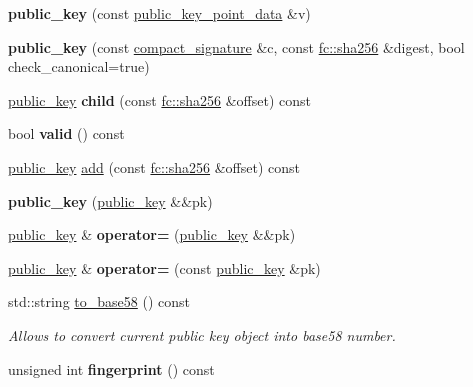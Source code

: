 \begin{DoxyCompactItemize}
{\bfseries public\+\_\+key} (const \mbox{\hyperlink{classfc_1_1array}{public\+\_\+key\+\_\+point\+\_\+data}} \&v)
\item 
\mbox{\label{classfc_1_1ecc_1_1public__key_ae2649fc2d1cf143a4519f33772e4525d}} 
{\bfseries public\+\_\+key} (const \mbox{\hyperlink{classfc_1_1array}{compact\+\_\+signature}} \&c, const \mbox{\hyperlink{classfc_1_1sha256}{fc\+::sha256}} \&digest, bool check\+\_\+canonical=true)
\item 
\mbox{\label{classfc_1_1ecc_1_1public__key_a40395b76b59e9ab3eb6b59925a62b093}} 
\mbox{\hyperlink{classfc_1_1ecc_1_1public__key}{public\+\_\+key}} {\bfseries child} (const \mbox{\hyperlink{classfc_1_1sha256}{fc\+::sha256}} \&offset) const
\item 
\mbox{\label{classfc_1_1ecc_1_1public__key_aab8d388b3e23e80a05cd62e2f3d94da2}} 
bool {\bfseries valid} () const
\item 
\mbox{\hyperlink{classfc_1_1ecc_1_1public__key}{public\+\_\+key}} \mbox{\hyperlink{classfc_1_1ecc_1_1public__key_a854601b24237d2723ff9672c1f6f17a7}{add}} (const \mbox{\hyperlink{classfc_1_1sha256}{fc\+::sha256}} \&offset) const
\item 
\mbox{\label{classfc_1_1ecc_1_1public__key_a400ebfdeea2d9d6bae80c0491a041afb}} 
{\bfseries public\+\_\+key} (\mbox{\hyperlink{classfc_1_1ecc_1_1public__key}{public\+\_\+key}} \&\&pk)
\item 
\mbox{\label{classfc_1_1ecc_1_1public__key_a0f44e10a2b5bc0cea474f11c88fcab45}} 
\mbox{\hyperlink{classfc_1_1ecc_1_1public__key}{public\+\_\+key}} \& {\bfseries operator=} (\mbox{\hyperlink{classfc_1_1ecc_1_1public__key}{public\+\_\+key}} \&\&pk)
\item 
\mbox{\label{classfc_1_1ecc_1_1public__key_a294d4a1e83961eb63dfe80064933b553}} 
\mbox{\hyperlink{classfc_1_1ecc_1_1public__key}{public\+\_\+key}} \& {\bfseries operator=} (const \mbox{\hyperlink{classfc_1_1ecc_1_1public__key}{public\+\_\+key}} \&pk)
\item 
\mbox{\label{classfc_1_1ecc_1_1public__key_a731da405da9f3482b49c72db07abdbae}} 
std\+::string \mbox{\hyperlink{classfc_1_1ecc_1_1public__key_a731da405da9f3482b49c72db07abdbae}{to\+\_\+base58}} () const
\begin{DoxyCompactList}\small\item\em Allows to convert current public key object into base58 number. \end{DoxyCompactList}\item 
\mbox{\label{classfc_1_1ecc_1_1public__key_aebb630107ec843fd248dad5bd3c41dea}} 
unsigned int {\bfseries fingerprint} () const
\end{DoxyCompactItemize}
